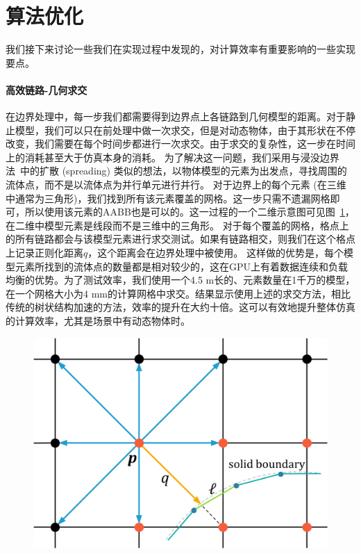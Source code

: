 \section{算法优化}
\label{sec:sig23_alg_optimal}
我们接下来讨论一些我们在实现过程中发现的，对计算效率有重要影响的一些实现要点。

\paragraph{高效链路-几何求交}
在边界处理中，每一步我们都需要得到边界点上各链路到几何模型的距离。对于静止模型，我们可以只在前处理中做一次求交，但是对动态物体，由于其形状在不停改变，我们需要在每个时间步都进行一次求交。由于求交的复杂性，这一步在时间上的消耗甚至大于仿真本身的消耗。
为了解决这一问题，我们采用与浸没边界法~\cite{Chen-2021}中的扩散 (spreading) 类似的想法，以物体模型的元素为出发点，寻找周围的流体点，而不是以流体点为并行单元进行并行。
对于边界上的每个元素 (在三维中通常为三角形)，我们找到所有该元素覆盖的网格。这一步只需不遗漏网格即可，所以使用该元素的AABB也是可以的。这一过程的一个二维示意图可见图~\ref{img:intersection}，在二维中模型元素是线段而不是三维中的三角形。
对于每个覆盖的网格，格点上的所有链路都会与该模型元素进行求交测试。如果有链路相交，则我们在这个格点上记录正则化距离$q$，这个距离会在边界处理中被使用。
这样做的优势是，每个模型元素所找到的流体点的数量都是相对较少的，这在GPU上有着数据连续和负载均衡的优势。为了测试效率，我们使用一个4.5 m长的、元素数量在1千万的模型，在一个网格大小为4 mm的计算网格中求交。结果显示使用上述的求交方法，相比传统的树状结构加速的方法，效率的提升在大约十倍。这可以有效地提升整体仿真的计算效率，尤其是场景中有动态物体时。

\begin{figure}[htb]
  \centering
    \includegraphics[width=0.7\columnwidth]{figures/intersection.png}
  \label{img:intersection}
\end{figure}

